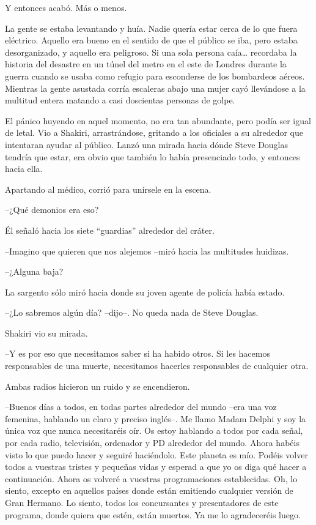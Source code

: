 Y entonces acabó. Más o menos.

La gente se estaba levantando y huía. Nadie quería estar cerca de lo que
fuera eléctrico. Aquello era bueno en el sentido de que el público se
iba, pero estaba desorganizado, y aquello era peligroso. Si una sola
persona caía\ldots{} recordaba la historia del desastre en un túnel del
metro en el este de Londres durante la guerra cuando se usaba como
refugio para esconderse de los bombardeos aéreos. Mientras la gente
asustada corría escaleras abajo una mujer cayó llevándose a la multitud
entera matando a casi doscientas personas de golpe.

El pánico huyendo en aquel momento, no era tan abundante, pero podía ser
igual de letal. Vio a Shakiri, arrastrándose, gritando a los oficiales a
su alrededor que intentaran ayudar al público. Lanzó una mirada hacia
dónde Steve Douglas tendría que estar, era obvio que también lo había
presenciado todo, y entonces hacia ella.

Apartando al médico, corrió para unírsele en la escena.

--¿Qué demonios era eso?

Él señaló hacia los siete ``guardias'' alrededor del cráter.

--Imagino que quieren que nos alejemos --miró hacia las multitudes
huidizas.

--¿Alguna baja?

La sargento sólo miró hacia donde su joven agente de policía había
estado.

--¿Lo sabremos algún día? --dijo--. No queda nada de Steve Douglas.

Shakiri vio su mirada.

--Y es por eso que necesitamos saber si ha habido otros. Si les hacemos
responsables de una muerte, necesitamos hacerles responsables de
cualquier otra.

Ambas radios hicieron un ruido y se encendieron.

--Buenos días a todos, en todas partes alrededor del mundo --era una voz
femenina, hablando un claro y preciso inglés--. Me llamo Madam Delphi y
soy la única voz que nunca necesitaréis oír. Os estoy hablando a todos
por cada señal, por cada radio, televisión, ordenador y PD alrededor del
mundo. Ahora habéis visto lo que puedo hacer y seguiré haciéndolo. Este
planeta es mío. Podéis volver todos a vuestras tristes y pequeñas vidas
y esperad a que yo os diga qué hacer a continuación. Ahora os volveré a
vuestras programaciones establecidas. Oh, lo siento, excepto en aquellos
países donde están emitiendo cualquier versión de Gran Hermano. Lo
siento, todos los concursantes y presentadores de este programa, donde
quiera que estén, están muertos. Ya me lo agradeceréis luego.

